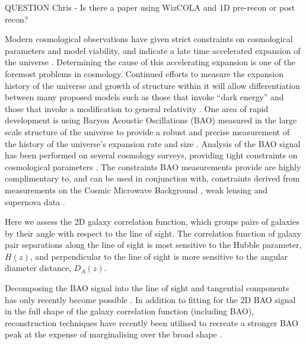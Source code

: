\documentclass[iop,twocolappendix]{emulateapj}
\newcommand{\red}{\color{red}}
\begin{document}
{\red QUESTION Chris - Is there a paper using WizCOLA and 1D pre-recon or post recon?}

Modern cosmological observations have given strict constraints on cosmological parameters and model viability, and indicate a late time accelerated expansion of the universe \citep{RiessFilippenko1998, PerlmutterAldering1999, SpergelVerde2003, RiessStrolger2004, TegmarkBlanton2004, SanchezBaugh2006, SpergelBean2007, Komatsu2009, RiessMacri2009, PercivalReid2010, ReidPercival2010,BlakeKazin2011}. Determining the cause of this accelerating expansion is one of the foremost problems in cosmology.   Continued efforts to measure the expansion history of the universe and growth of structure within it will allow differentiation between many proposed models such as those that invoke ``dark energy'' and those that invoke a modification to general relativity \citep{AlbrechtBernstein2006, SanchezScoccola2012}. One area of rapid development is using Baryon Acoustic Oscillations (BAO) measured in the large scale structure of the universe to provide a robust and precise measurement of the history of the universe's expansion rate and size \citep{EisensteinHu1998,BlakeGlazebrook2003,HuHaiman2003,Linder2003,SeoEisenstein2003}. Analysis of the BAO signal has been performed on several cosmology surveys, providing tight constraints on cosmological parameters \citep{Eisenstein2005,PercivalCole2007,Gaztanaga2009,PercivalReid2010,BlakeDavis2011,BlakeKazin2011, SanchezKazinBeutler2013, AndersonAubourg2014}. The constraints BAO measurements provide are highly complimentary to, and can be used in conjunction with, constraints derived from measurements on the Cosmic Microwave Background  \citep[CMB;][]{BennettHalpern2003, Planck201416}, weak lensing \citep{VanWaerbeke2000,WittmanTyson2000,KaiserWilson2000} and supernova data \citep{KowalskiRubin2008, KesslerBeckerCinabro2009, BetouleKessler2014}.

Here we assess the 2D galaxy correlation function, which groups pairs of galaxies by their angle with respect to the line of sight.  The correlation function of galaxy pair separations along the line of sight is most sensitive to the Hubble parameter, $H(z)$, and  perpendicular to the line of sight is more sensitive to the angular diameter distance, $D_A(z)$.  

Decomposing the BAO signal into the line of sight and tangential components has only recently become possible \citep{Gaztanaga2009, XuCuesta2013, AndersonAubourg2014DR11, AndersonAubourg2014}. In addition to fitting for the 2D BAO signal in the full shape of the galaxy correlation function (including BAO), reconstruction techniques have recently been utilised to recreate a stronger BAO peak at the expense of marginalising over the broad shape \citep{KazinKoda2014, PadmanabhanXuEisenstein2012}.
\end{document}
